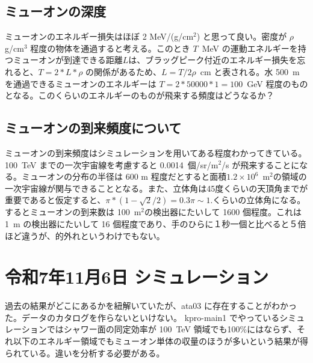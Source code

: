 \subsection{ミューオンの深度}

ミューオンのエネルギー損失はほぼ 2 MeV/(g/cm$^{2}$) と思って良い。密度が $\rho$ g/cm$^{3}$ 程度の物体を通過すると考える。このとき $T$~MeV の運動エネルギーを持つミューオンが到達できる距離$L$は、ブラッグピーク付近のエネルギー損失を忘れると、$ T = 2 * L * \rho$ の関係があるため、$L = T / 2\rho$~cm と表される。水 500~m を通過できるミューオンのエネルギーは $T = 2 * 50000 * 1 = 100$~GeV 程度のものとなる。このくらいのエネルギーのものが飛来する頻度はどうなるか？

\subsection{ミューオンの到来頻度について}

ミューオンの到来頻度はシミュレーションを用いてある程度わかってきている。 100~TeV までの一次宇宙線を考慮すると 0.0014~個/sr/m$^{2}$/s が飛来することになる。ミューオンの分布の半径は 600 m 程度だとすると面積$1.2\times 10^{6}$~m$^{2}$の領域の一次宇宙線が関与できることとなる。また、立体角は45度くらいの天頂角までが重要であると仮定すると、$\pi*(1 - \sqrt{2}/2) = 0.3 \pi \sim 1$.くらいの立体角になる。するとミューオンの到来数は 100~m$^{2}$の検出器にたいして 1600 個程度。これは 1~m の検出器にたいして 16 個程度であり、手のひらに１秒一個と比べると５倍ほど違うが、的外れというわけでもない。


\section{令和7年11月6日 シミュレーション}

過去の結果がどこにあるかを紐解いていたが、ata03 に存在することがわかった。データのカタログを作らないといけない。
kpro-main1 でやっているシミュレーションではシャワー面の同定効率が 100~TeV 領域でも100\%にはならず、それ以下のエネルギー領域でもミューオン単体の収量のほうが多いという結果が得られている。違いを分析する必要がある。

